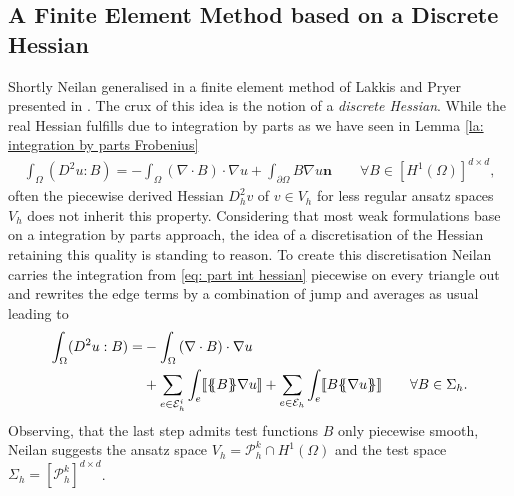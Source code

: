 \subsection{A Finite Element Method based on a Discrete Hessian} \label{subsec: disrete Hessian} \label{sec: FEM discrete Hessian}

Shortly Neilan generalised in \cite{Neilan2014} a finite element method of Lakkis and Pryer presented in \cite{LP2011}.
The crux of this idea is the notion of a \emph{discrete Hessian}. 
While the real Hessian fulfills due to integration by parts as we have seen in Lemma \ref{la: integration by parts Frobenius}
	\begin{align}
		\int_\Omega (D^2 u : B) = - \int_\Omega \left(\nabla \cdot B\right) \cdot \nabla u + \int_{\partial \Omega}  B \nabla u \mathbf {n} \qquad \forall B \in [H^1(\Omega)]^{d \times d}, \label{eq: part int hessian}
	\end{align}
often the piecewise derived Hessian $D_h^2 v$ of $ v \in V_h$ for less regular ansatz spaces $V_h$ does not inherit this property. Considering that most weak formulations base on a integration by parts approach, the idea of a discretisation of the Hessian retaining this quality is standing to reason. To create this discretisation Neilan carries the integration from \eqref{eq: part int hessian} piecewise on every triangle out and rewrites the edge terms by a combination of jump and averages as usual leading to
	\begin{align}
		\begin{split}
		\int_\Omega (D^2 u : B) 
		=& - \int_\Omega \left(\nabla \cdot B\right) \cdot \nabla u \\
		&+ \sum_{ e \in \edgesi} \int_e  \jump {\average B \nabla u }
				+ \sum_{ e \in \edges} \int_e  \jump{B \average {\nabla u} }  \qquad \forall B \in \Sigma_h. \label{eq: part int hessian omega}
		\end{split}
	\end{align}
Observing, that the last step admits test functions $B$ only piecewise smooth, Neilan suggests the ansatz space $V_h = \mathcal{P}_h^k \cap H^1(\Omega)$ and the test space $\Sigma_h = [\mathcal{P}_h^k]^{d \times d}$.

